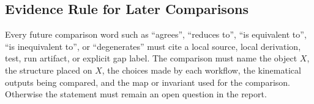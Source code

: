 \subsection{Evidence Rule for Later Comparisons}

Every future comparison word such as ``agrees'', ``reduces to'', ``is
equivalent to'', ``is inequivalent to'', or ``degenerates'' must cite a local
source, local derivation, test, run artifact, or explicit gap label.  The
comparison must name the object \(X\), the structure placed on \(X\), the
choices made by each workflow, the kinematical outputs being compared, and the
map or invariant used for the comparison.  Otherwise the statement must remain
an open question in the report.

